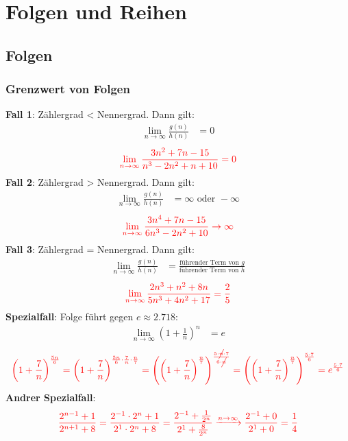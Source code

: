 \section{Folgen und Reihen}
\subsection{Folgen}

\subsubsection{Grenzwert von Folgen}
\textbf{Fall 1}: Zählergrad < Nennergrad. Dann gilt:
\begin{align*}
	\lim_{n \to \infty} \frac{g(n)}{h(n)} & = 0
\end{align*}
\begin{align*}
	\textcolor{red}{\lim_{n \to \infty} \frac{3n^2 + 7n - 15}{n^3 - 2n^2 + n + 10} = 0}
\end{align*}
\textbf{Fall 2}: Zählergrad > Nennergrad. Dann gilt:
\begin{align*}
	\lim_{n \to \infty} \frac{g(n)}{h(n)} & = \infty \text{ oder } -\infty
\end{align*}
\begin{align*}
	\textcolor{red}{\lim_{n \to \infty} \frac{3n^4 + 7n - 15}{6n^3 - 2n^2 + 10} \to \infty}
\end{align*}
\textbf{Fall 3}: Zählergrad = Nennergrad. Dann gilt:
\begin{align*}
	\lim_{n \to \infty} \frac{g(n)}{h(n)} & = \frac{\text{führender Term von } g}{\text{führender Term von } h}
\end{align*}
\begin{align*}
	\textcolor{red}{\lim_{n \to \infty} \frac{2n^3 + n^2 + 8n}{5n^3 + 4n^2 + 17} = \frac{2}{5}}
\end{align*}
\textbf{Spezialfall}: Folge führt gegen $e \approx 2.718$:
\begin{align*}
	\lim_{n \to \infty} (1+\frac{1}{n})^n & = e
\end{align*}
\begin{align*}
	\textcolor{red}{\left(1 + \frac{7}{n}\right)^{\frac{5n}{6}} = \left(1 + \frac{7}{n}\right)^{\frac{5n}{6} \cdot \frac{7}{n} \cdot \frac{n}{7}} = \left(\left(1 + \frac{7}{n}\right)^{\frac{n}{7}}\right)^{\frac{5 \cdot \cancel{n}\cdot 7}{6 \cdot \cancel{n}}} = \left(\left(1 + \frac{7}{n}\right)^{\frac{n}{7}}\right)^{\frac{5 \cdot 7}{6}} = e^{\frac{5 \cdot 7}{6}}}
\end{align*}
\textbf{Andrer Spezialfall}:
\begin{align*}
	\textcolor{red}{\frac{2^{n-1} + 1}{2^{n+1} + 8} = \frac{2^{-1} \cdot 2^{n}+ 1}{2^{1} \cdot 2^{n} + 8} = \frac{2^{-1} + \frac{1}{2^n}}{2^1 + \frac{8}{2^n}} \xrightarrow{n \to \infty} \frac{2^{-1} + 0}{2^1 + 0} = \frac{1}{4}}
\end{align*}

